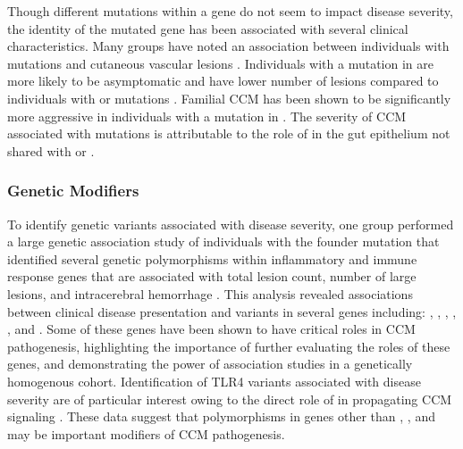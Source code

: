 Though different mutations within a gene do not seem to impact disease severity, the identity of the mutated gene has been associated with several clinical characteristics. Many groups have noted an association between individuals with  mutations and cutaneous vascular lesions \citep{gianfrancesco2007, sirvente2009, musunuru2003, grippaudo2013, wang2013, eerola2000, labauge1999}. Individuals with a mutation in  are more likely to be asymptomatic and have lower number of lesions compared to individuals with  or  mutations \citep{denier2006}. Familial CCM has been shown to be significantly more aggressive in individuals with a mutation in  \citep{fauth2015, shenkar2015, riant2013}. The severity of CCM associated with  mutations is attributable to the role of  in the gut epithelium not shared with  or  \citep{tang2019}. 

\subsubsection{Genetic Modifiers}
To identify genetic variants associated with disease severity, one group performed a large genetic association study of individuals with the  founder mutation that identified several genetic polymorphisms within inflammatory and immune response genes that are associated with total lesion count, number of large lesions, and intracerebral hemorrhage \citep{choquet2014}. This analysis revealed associations between clinical disease presentation and variants in several genes including: , , , , , and . Some of these genes have been shown to have critical roles in CCM pathogenesis, highlighting the importance of further evaluating the roles of these genes, and demonstrating the power of association studies in a genetically homogenous cohort. Identification of TLR4 variants associated with disease severity are of particular interest owing to the direct role of  in propagating CCM signaling \citep{tang2019}. These data suggest that polymorphisms in genes other than , , and  may be important modifiers of CCM pathogenesis. 

